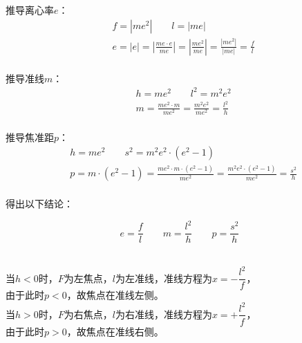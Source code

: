\documentclass[UTF8]{ctexart}
\begin{document}
    推导离心率$e$：
    \begin{align}
        &f=\left|me^2\right|\qquad l=|me|\\[3mm]
        &e=|e|=\left|\frac{me\cdot e}{me}\right|=\left|\frac{me^2}{me}\right|=\frac{\left|me^2\right|}{|me|}=\frac{f}{l}
    \end{align}\\
    推导准线$m$：
    \begin{align}
        &h=me^2\qquad l^2=m^2e^2\\[3mm]
        &m
        =\frac{me^2\cdot m}{me^2}
        =\frac{m^2e^2}{me^2}
        =\frac{l^2}{h}
    \end{align}\\
    推导焦准距$p$：
    \begin{align}
        &h=me^2\qquad s^2=m^2e^2\cdot\left(e^2-1\right)\\[3mm]
        &p
        =m\cdot\left(e^2-1\right)
        =\frac{me^2\cdot m\cdot\left(e^2-1\right)}{me^2}
        =\frac{m^2e^2\cdot\left(e^2-1\right)}{me^2}
        =\frac{s^2}{h}
    \end{align}\\
    得出以下结论：
    \begin{large}
        \begin{equation*}
            e=\frac{f}{l}\qquad m=\frac{l^2}{h}\qquad p=\frac{s^2}{h}
        \end{equation*}
    \end{large}\\[1mm]
    当$h<0$时，$F$为左焦点，$l$为左准线，准线方程为$x=-\dfrac{l^2}{f}$，\\[1mm]
    由于此时$p<0$，故焦点在准线左侧。\\[3mm]
    当$h>0$时，$F$为右焦点，$l$为右准线，准线方程为$x=+\dfrac{l^2}{f}$，\\[1mm]
    由于此时$p>0$，故焦点在准线右侧。\vspace{6pt}
\end{document}
